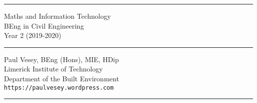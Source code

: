 
\thispagestyle{empty} %


\hrule

\vspace*{0.7cm} %


\begin{flushright}
\Huge Maths and Information Technology \\
\vspace*{0.7cm}
\Large BEng in Civil Engineering\\
Year 2 (2019-2020)
\end{flushright}

\vspace*{0.7cm} %
	
\normalsize

\hrule


\vfill %


{\centering \large 
\hfill Paul Vesey, \scriptsize BEng (Hons), MIE, HDip\normalsize \\
\hfill Limerick Institute of Technology \\
\hfill Department of the Built Environment \\
\hfill \texttt{https://paulvesey.wordpress.com} \\
\vspace*{0.7cm} 
\hrule} %


\clearpage %

